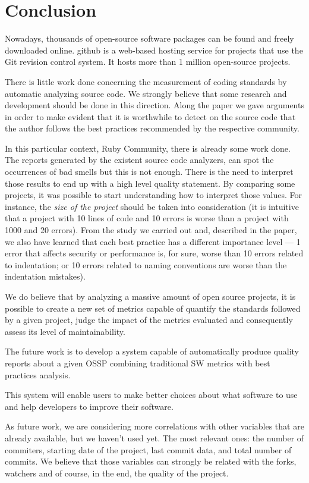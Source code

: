 \thispagestyle{empty}
\chapter{Conclusion}\label{chap:conclusion}


Nowadays, thousands of open-source software packages can be found and freely downloaded online.
github is a web-based hosting service for projects that use the Git revision control system.
It hosts more than 1 million open-source projects.

There is little work done concerning the measurement of coding standards by automatic analyzing source code.
We strongly believe that some research and development should be done in this direction.
Along the paper we gave arguments in order to make evident that it is worthwhile to detect on the source code
that the author follows the best practices recommended by the respective community.

In this particular context, Ruby Community, there is already some work done.
The  reports generated by the existent source code analyzers,
can spot the occurrences of bad smells but this is not enough.
There is the need to interpret those results to end up with a high level quality statement.
By comparing some projects, it was possible to start understanding how to interpret those values.
For instance, the \emph{size of the project} should be taken into consideration
(it is intuitive that a project with 10 lines of code and 10 errors is worse than a project with 1000 and 20 errors).
From the study we carried out and, described in the paper,
we also have learned that each best practice has a different importance level
--- 1 error that  affects security or performance is, for sure, worse than 10 errors related to indentation;
or 10 errors related to naming conventions are worse than the indentation mistakes).

We do believe that by analyzing a massive amount of open source projects,
it is possible to create a new set of metrics capable of quantify the standards followed by a given project,
judge the impact of the metrics evaluated
and consequently assess its level of maintainability.

The future work is to develop a system capable of automatically produce quality reports about a given OSSP
combining traditional SW metrics with best practices analysis.

This system will enable users to make better choices about what software to use and help developers to improve their software.







As future work, we are considering more correlations with other variables that are already available, but we haven't used yet. The most relevant ones: the number of commiters, starting date of the project, last commit data, and total number of commits. We believe that those variables can strongly be related with the forks, watchers and of course, in the end, the quality of the project.

